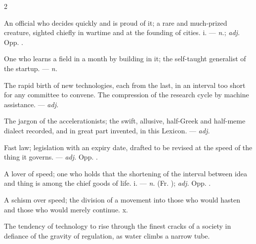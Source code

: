 \begin{multicols}{2}

 An official who decides quickly and is proud of it; a rare and much-prized creature, sighted chiefly in wartime and at the founding of cities.   i. —  \textit{n.};  \textit{adj.} Opp. .

 One who learns a field in a month by building in it; the self-taught generalist of the startup. —  \textit{n.}

  The rapid birth of new technologies, each from the last, in an interval too short for any committee to convene.   The compression of the research cycle by machine assistance. —  \textit{adj.}

 The jargon of the accelerationists; the swift, allusive, half-Greek and half-meme dialect recorded, and in great part invented, in this Lexicon. —  \textit{adj.}

 Fast law; legislation with an expiry date, drafted to be revised at the speed of the thing it governs. —  \textit{adj.} Opp. .

 A lover of speed; one who holds that the shortening of the interval between idea and thing is among the chief goods of life.   i. —  \textit{n.} (Fr. );  \textit{adj.} Opp. .

 A schism over speed; the division of a movement into those who would hasten and those who would merely continue.   x.

 The tendency of technology to rise through the finest cracks of a society in defiance of the gravity of regulation, as water climbs a narrow tube.


\end{multicols}
